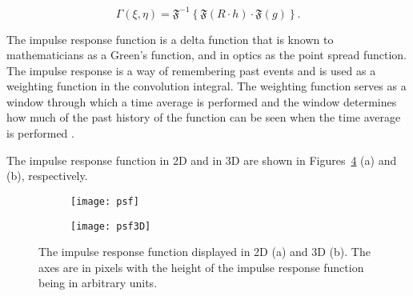     \begin{equation}
        \Gamma(\xi,\eta) = \mathfrak{F}^{-1}\left\{ \mathfrak{F}(R\cdot h)
        \cdot\mathfrak{F}(g) \right\} .
        \label{eq:convReconstruction}
    \end{equation}

    The impulse response function is a delta function that is known to
    mathematicians as a Green's function,
    and in optics as the point spread function. The impulse response is
    a way of remembering past events and is used as a weighting function in the
    convolution integral. The weighting function serves as a window through which a
    time average is performed and the window determines how much of the past history
    of the function can be seen when the time average is performed
    \cite{guenther_modern_1990}.

    The impulse response function in 2D and in 3D are shown in
    Figures~\ref{fig:pointSpreadFunction} (a) and (b), respectively.

    \begin{figure}[htbp!]
        \ContinuedFloat
        \begin{center}
        \begin{subfigure}[t]{\textwidth}
            \texttt{[image: psf]}
            \caption{}
            \label{fig:psf}
        \end{subfigure}
        \end{center}
    \end{figure}

    \begin{figure}[htbp!]
        \ContinuedFloat
        \begin{center}
        \begin{subfigure}[t]{0.5\textwidth}
            \texttt{[image: psf3D]}
            \caption{}
            \label{fig:psf3D}
        \end{subfigure}
        \end{center}
        \caption{The impulse response function displayed in 2D (a) and 3D (b).
        The axes are in pixels with the height of the impulse response function
    being in arbitrary units.}
        \label{fig:pointSpreadFunction}
    \end{figure}

